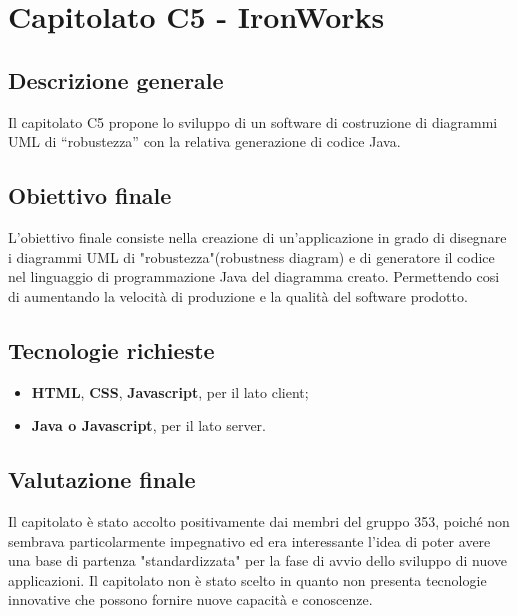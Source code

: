 \documentclass[StudioDiFattibilità.tex]{subfiles}
\begin{document}
\chapter{Capitolato C5 - IronWorks}
\section{Descrizione generale}
Il capitolato C5 propone lo sviluppo di un software
di costruzione di diagrammi UML di “robustezza” con la relativa generazione di codice Java.
\section{Obiettivo finale}
L'obiettivo finale consiste nella creazione di un'applicazione in grado di disegnare i diagrammi UML di "robustezza"(robustness diagram) e di generatore il codice nel linguaggio di programmazione Java del diagramma creato. Permettendo cosi di aumentando la velocità di produzione e la qualità del software prodotto.
\section{Tecnologie richieste}
\begin{itemize}
	\item \textbf{HTML}, \textbf{CSS}, \textbf{Javascript}, per il lato client;
	\item \textbf{Java o Javascript}, per il lato server.
\end{itemize}
\section{Valutazione finale}
Il capitolato è stato accolto positivamente dai membri del gruppo 353, poiché non sembrava particolarmente impegnativo ed era interessante l'idea di poter avere una base di partenza "standardizzata" per la fase di avvio dello sviluppo di nuove applicazioni. Il capitolato non è stato scelto in quanto non presenta tecnologie innovative che possono fornire nuove capacità e conoscenze.
\end{document}
